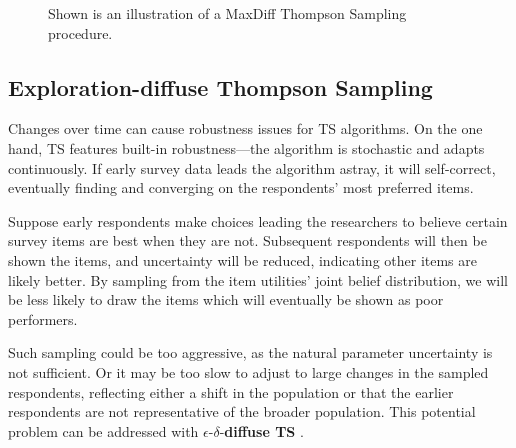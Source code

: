 \documentclass[nonblindrev]{informs3}
\newcommand{\edts}{$\epsilon$-$\delta$-\textbf{diffuse TS} }
\begin{document}
\begin{figure}
\caption{Shown is an illustration of a MaxDiff Thompson Sampling procedure.}
\label{fig:illustrate_ts}
	\begin{center}
    \qquad
    \end{center}
\end{figure}

\subsection{Exploration-diffuse Thompson Sampling}

Changes over time can cause robustness issues for TS algorithms. On the one hand, TS features built-in robustness---the algorithm is stochastic and adapts continuously. If early survey data leads the algorithm astray, it will self-correct, eventually finding and converging on the respondents' most preferred items. 

Suppose  early respondents make choices leading the researchers to believe certain survey items are best when they are not. Subsequent respondents will then be shown the items, and uncertainty will be reduced, indicating other items are likely better. By sampling from the item utilities' joint belief distribution, we will be less likely to draw the items which will eventually be shown as poor performers. 

Such sampling could be too aggressive, as the natural parameter uncertainty is not sufficient. Or it may be too slow to adjust to large changes in the sampled respondents, reflecting either a shift in the population or that the earlier respondents are not representative of the broader population. This potential problem can be addressed with \edts.
\end{document}
